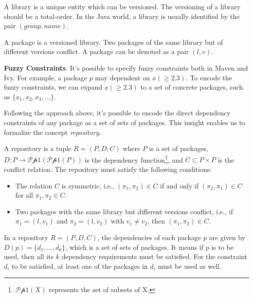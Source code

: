 \begin{definition}[Library]
  A library is a unique entity which can be versioned.  The versioning of a library should be a total-order. In the Java world, a library is usually identified by the pair $(group, name)$.
\end{definition}

\begin{definition}[Package]
  A package is a versioned library. Two packages of the same library but of different versions conflict.  A package can be denoted as a pair $(l, v)$.
\end{definition}


\noindent
\textbf{Fuzzy Constraints}. It's possible to specify fuzzy constraints both in Maven and Ivy. For example, a package $p$ may dependent on $x(\geq 2.3)$. To encode the fuzzy constraints, we can expand $x(\geq 2.3)$ to a set of  concrete packages, such as $\{x_1, x_2, x_3, ...\}$.

Following the approach above, it's possible to encode the direct dependency constraints of any package as a set of sets of packages. This insight enables us to formalize the concept \emph{repository}\cite{mancinelli2006managing}.

\begin{definition}[Repository]
  A repository is a tuple $R = (P, D, C)$ where $P$ is a set of packages, $D : P \rightarrow \mathscr{P p 1}(\mathscr{P p 1}(P))$ is the dependency function\footnote{$\mathscr{P p 1}(X)$ represents the set of subsets of X.}, and $C \subset P \times P$ is the conflict relation. The repository must satisfy the following conditions:

  \begin{itemize}
  \item The relation $C$ is symmetric, i.e., $(\pi_1, \pi_2) \in C$ if and only if $(\pi_2, \pi_1) \in C$ for all $\pi_1, \pi_2 \in C$.
  \item Two packages with the same library but different versions conflict, i.e., if $\pi_1 = (l, v_1)$ and $\pi_2 = (l, v_2)$ with $v_1 \neq v_2$, then $(\pi_1, \pi_2) \in C$.
  \end{itemize}
\end{definition}

In a repository $R = (P, D, C)$, the dependencies of each package $p$ are given by $D(p) = \{d_1, ..., d_k\}$, which is a set of sets of packages. It means if $p$ is to be used, then all its $k$ dependency requirements must be satisfied. For the constraint $d_i$ to be satisfied, at least one of the packages in $d_i$ must be used as well.

